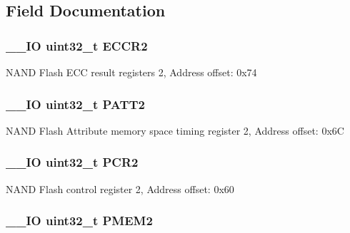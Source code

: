 \subsection{Field Documentation}
\hypertarget{struct_f_s_m_c___bank2___type_def_a05a47a1664adc7a3db3fa3e83fe883b4}{
\subsubsection[{E\-C\-C\-R2}]{\setlength{\rightskip}{0pt plus 5cm}\-\_\-\-\_\-\-I\-O uint32\-\_\-t E\-C\-C\-R2}}\label{struct_f_s_m_c___bank2___type_def_a05a47a1664adc7a3db3fa3e83fe883b4}
N\-A\-N\-D Flash E\-C\-C result registers 2, Address offset\-: 0x74 \hypertarget{struct_f_s_m_c___bank2___type_def_a9c1bc909ec5ed32df45444488ea6668b}{
\subsubsection[{P\-A\-T\-T2}]{\setlength{\rightskip}{0pt plus 5cm}\-\_\-\-\_\-\-I\-O uint32\-\_\-t P\-A\-T\-T2}}\label{struct_f_s_m_c___bank2___type_def_a9c1bc909ec5ed32df45444488ea6668b}
N\-A\-N\-D Flash Attribute memory space timing register 2, Address offset\-: 0x6\-C \hypertarget{struct_f_s_m_c___bank2___type_def_ab0cb1d704ee64c62ad5be55522a2683a}{
\subsubsection[{P\-C\-R2}]{\setlength{\rightskip}{0pt plus 5cm}\-\_\-\-\_\-\-I\-O uint32\-\_\-t P\-C\-R2}}\label{struct_f_s_m_c___bank2___type_def_ab0cb1d704ee64c62ad5be55522a2683a}
N\-A\-N\-D Flash control register 2, Address offset\-: 0x60 \hypertarget{struct_f_s_m_c___bank2___type_def_a2e5a7a96de68a6612affa6df8c309c3d}{
\subsubsection[{P\-M\-E\-M2}]{\setlength{\rightskip}{0pt plus 5cm}\-\_\-\-\_\-\-I\-O uint32\-\_\-t P\-M\-E\-M2}}\label{struct_f_s_m_c___bank2___type_def_a2e5a7a96de68a6612affa6df8c309c3d}
